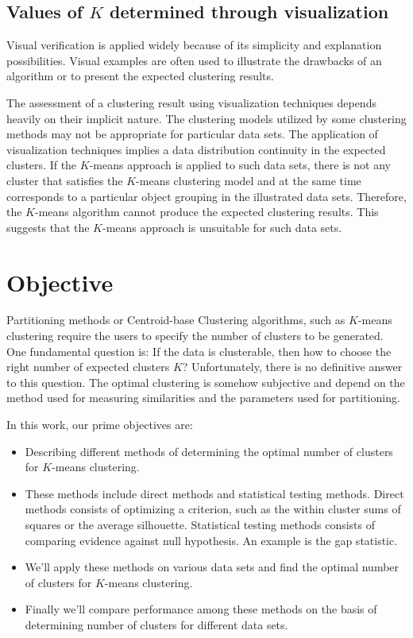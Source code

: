 \subsection{Values of $K$ determined through visualization}
Visual  verification  is  applied  widely  because  of  its
simplicity and explanation possibilities. Visual
examples  are  often  used  to  illustrate  the  drawbacks
of an algorithm or to present the expected clustering
results.~\cite{bilmes97}

The    assessment    of    a    clustering    result    using
visualization  techniques  depends  heavily  on  their
implicit  nature.  The  clustering  models  utilized  by
some  clustering  methods  may  not  be  appropriate
for   particular   data   sets. The  application  of
visualization  techniques  implies  a  data  distribution
continuity  in  the  expected  clusters.  If  the $K$-means
approach  is  applied  to  such  data  sets,  there  is  not
any    cluster    that    satisfies   the $K$-means   clustering
model  and  at  the  same  time  corresponds  to  a
particular   object   grouping   in   the   illustrated   data
sets.  Therefore,  the $K$-means  algorithm  cannot  produce
the  expected  clustering  results.  This  suggests
that  the $K$-means  approach  is  unsuitable  for  such
data sets.

\section{Objective}
Partitioning methods or Centroid-base Clustering algorithms, such as $K$-means clustering require the users to specify
the number of clusters to be generated. One fundamental question is: If the data is clusterable, then how to choose the
right number of expected clusters $K$? Unfortunately, there is no definitive answer to this question. The optimal
clustering is somehow subjective and depend on the method used for measuring similarities and the parameters used for
partitioning.

In this work, our prime objectives are:

\begin{itemize}
\item Describing different methods of determining the optimal number of clusters for $K$-means clustering.
\item These methods include direct methods and statistical testing methods. Direct methods consists of
optimizing a criterion, such as the within cluster sums of squares or the average silhouette. Statistical
testing methods consists of comparing evidence against null hypothesis. An example is the gap statistic.
\item We'll apply these methods on various data sets and find the optimal number of clusters for $K$-means clustering.
\item Finally we'll compare performance among these methods on the basis of determining number of clusters for
different data sets.
\end{itemize}

